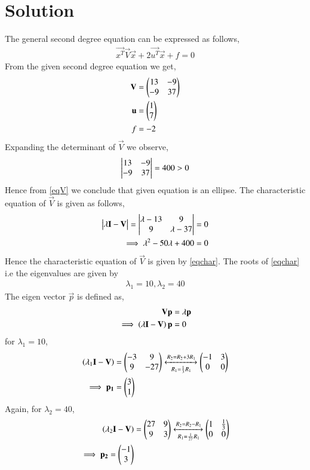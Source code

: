 \documentclass[journal,12pt,twocolumn]{IEEEtran}
\begin{document}
\section{Solution}
The general second degree equation can be expressed as follows,
\begin{align}
\vec{x^T}\vec{V}\vec{x}+2\vec{u^T}\vec{x}+f=0\label{eqmain}
\end{align}
From the given second degree equation we get,
\begin{align}
\mathbf{V} &= \begin{pmatrix}13&-9\\-9&37\end{pmatrix}\\
\mathbf{u} &= \begin{pmatrix}1\\7\end{pmatrix}\\
f &= -2
\end{align}
Expanding the determinant of $\vec{V}$ we observe, 
\begin{align}
\begin{vmatrix}13&-9\\-9&37\end{vmatrix} = 400>0 \label{eqV}
\end{align}
Hence from \eqref{eqV} we conclude that given equation is an ellipse. The characteristic equation of $\vec{V}$ is given as follows,
\begin{align}
\begin{vmatrix}\lambda\mathbf{I}-\mathbf{V}\end{vmatrix} = \begin{vmatrix}\lambda-13&9\\9&\lambda-37\end{vmatrix} &= 0\\
\implies \lambda^2-50\lambda+400 &= 0\label{eqchar}
\end{align}
Hence the characteristic equation of $\vec{V}$ is given by \eqref{eqchar}. The roots of \eqref{eqchar} i.e the eigenvalues are given by
\begin{align}
\lambda_1=10, \lambda_2=40\label{eqeigenvals}    
\end{align}
The eigen vector $\vec{p}$ is defined as, 
\begin{align}
\mathbf{V}\mathbf{p} &= \lambda\mathbf{p}\\
\implies\left(\lambda\mathbf{I}-\mathbf{V}\right)\mathbf{p}&=0
\end{align}
for $\lambda_1=10$,
\begin{align}
\left(\lambda_1\mathbf{I}-\mathbf{V}\right)&=\begin{pmatrix}-3&9\\9&-27\end{pmatrix}\xleftrightarrow[R_1=\frac{1}{3}R_1]{R_2=R_2+3R_1}\begin{pmatrix}-1&3\\0&0\end{pmatrix}\\
\implies\mathbf{p_1}&=\begin{pmatrix}3\\1\end{pmatrix}
\end{align}
Again, for $\lambda_2=40$,
\begin{align}
\left(\lambda_2\mathbf{I}-\mathbf{V}\right)&=\begin{pmatrix}27&9\\9&3\end{pmatrix}\xleftrightarrow[R_1=\frac{1}{27}R_1]{R_2=R_2-R_1}\begin{pmatrix}1&\frac{1}{3}\\0&0\end{pmatrix}\\
\implies\mathbf{p_2}=\begin{pmatrix}-1\\3\end{pmatrix}
\end{align}
\end{document}
